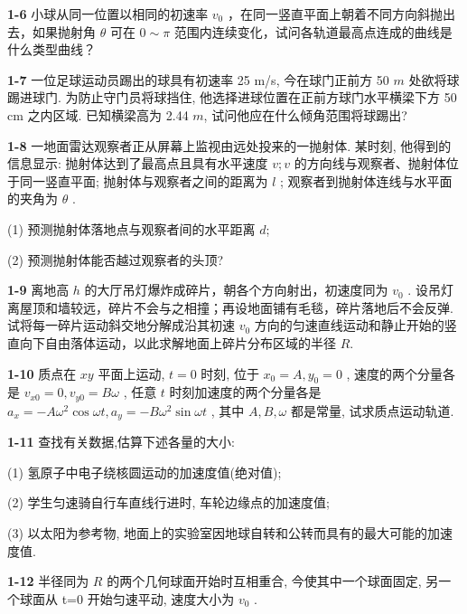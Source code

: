 \newpage

\textbf{1-6} 小球从同一位置以相同的初速率 $v_{0}$ ，在同一竖直平面上朝着不同方向斜抛出去，如果抛射角 $\theta$ 可在 $0 \sim \pi$ 范围内连续变化，试问各轨道最高点连成的曲线是什么类型曲线？

\newpage

\textbf{1-7} 一位足球运动员踢出的球具有初速率 25 m/s, 今在球门正前方 50 $m$ 处欲将球踢进球门. 为防止守门员将球挡住, 他选择进球位置在正前方球门水平横梁下方 50 cm 之内区域. 已知横梁高为 2.44 $m$, 试问他应在什么倾角范围将球踢出?

\newpage

\textbf{1-8} 一地面雷达观察者正从屏幕上监视由远处投来的一抛射体. 某时刻, 他得到的信息显示: 抛射体达到了最高点且具有水平速度 $v; v$ 的方向线与观察者、抛射体位于同一竖直平面; 抛射体与观察者之间的距离为 $l$ ; 观察者到抛射体连线与水平面的夹角为 $\theta$ .

(1) 预测抛射体落地点与观察者间的水平距离 $d$;

(2) 预测抛射体能否越过观察者的头顶?

\newpage

\textbf{1-9} 离地高 $h$ 的大厅吊灯爆炸成碎片，朝各个方向射出，初速度同为 $v_{0}$ . 设吊灯离屋顶和墙较远，碎片不会与之相撞；再设地面铺有毛毯，碎片落地后不会反弹. 试将每一碎片运动斜交地分解成沿其初速 $v_{0}$ 方向的匀速直线运动和静止开始的竖直向下自由落体运动，以此求解地面上碎片分布区域的半径 $R$.

\newpage

\textbf{1-10} 质点在 $xy$ 平面上运动, $t = 0$ 时刻, 位于 $x_0 = A, y_0 = 0$ , 速度的两个分量各是 $v_{x0} = 0, v_{y0} = B\omega$ , 任意 $t$ 时刻加速度的两个分量各是 $a_x = -A\omega^2 \cos \omega t, a_y = -B\omega^2 \sin \omega t$ , 其中 $A, B, \omega$ 都是常量, 试求质点运动轨道.

\newpage

\textbf{1-11} 查找有关数据,估算下述各量的大小:

(1) 氢原子中电子绕核圆运动的加速度值(绝对值);

(2) 学生匀速骑自行车直线行进时, 车轮边缘点的加速度值;

(3) 以太阳为参考物, 地面上的实验室因地球自转和公转而具有的最大可能的加速度值.

\newpage

\textbf{1-12} 半径同为 $R$ 的两个几何球面开始时互相重合, 今使其中一个球面固定, 另一个球面从 t=0 开始匀速平动, 速度大小为 $v_{0}$ .

